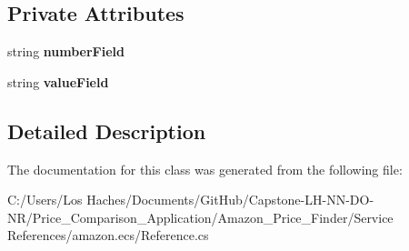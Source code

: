 \subsection*{Private Attributes}
\begin{DoxyCompactItemize}
\item 
\hypertarget{class_price___comparison_1_1amazon_1_1ecs_1_1_tracks_disc_track_a6bf9341cebba1228f950004408c51141}{string {\bfseries number\-Field}}\label{class_price___comparison_1_1amazon_1_1ecs_1_1_tracks_disc_track_a6bf9341cebba1228f950004408c51141}

\item 
\hypertarget{class_price___comparison_1_1amazon_1_1ecs_1_1_tracks_disc_track_a3bc0d1534cf8db0e7b69fc7e73e1acfd}{string {\bfseries value\-Field}}\label{class_price___comparison_1_1amazon_1_1ecs_1_1_tracks_disc_track_a3bc0d1534cf8db0e7b69fc7e73e1acfd}

\end{DoxyCompactItemize}


\subsection{Detailed Description}


The documentation for this class was generated from the following file\-:\begin{DoxyCompactItemize}
\item 
C\-:/\-Users/\-Los Haches/\-Documents/\-Git\-Hub/\-Capstone-\/\-L\-H-\/\-N\-N-\/\-D\-O-\/\-N\-R/\-Price\-\_\-\-Comparison\-\_\-\-Application/\-Amazon\-\_\-\-Price\-\_\-\-Finder/\-Service References/amazon.\-ecs/Reference.\-cs\end{DoxyCompactItemize}
